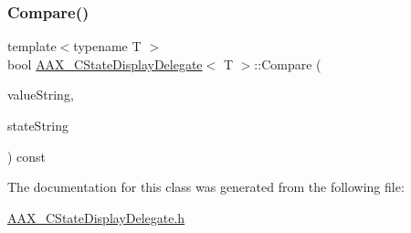 \mbox{\label{a01561_a945f045fc8348325ed05abcf75b85456}} 
\subsubsection{\texorpdfstring{Compare()}{Compare()}}
{\footnotesize\ttfamily template$<$typename T $>$ \\
bool \mbox{\hyperlink{a01561}{A\+A\+X\+\_\+\+C\+State\+Display\+Delegate}}$<$ T $>$\+::Compare (\begin{DoxyParamCaption}\item[{const \mbox{\hyperlink{a01573}{A\+A\+X\+\_\+\+C\+String}} \&}]{value\+String,  }\item[{const \mbox{\hyperlink{a01573}{A\+A\+X\+\_\+\+C\+String}} \&}]{state\+String }\end{DoxyParamCaption}) const}



The documentation for this class was generated from the following file\+:\begin{DoxyCompactItemize}
\item 
\mbox{\hyperlink{a00470}{A\+A\+X\+\_\+\+C\+State\+Display\+Delegate.\+h}}\end{DoxyCompactItemize}
